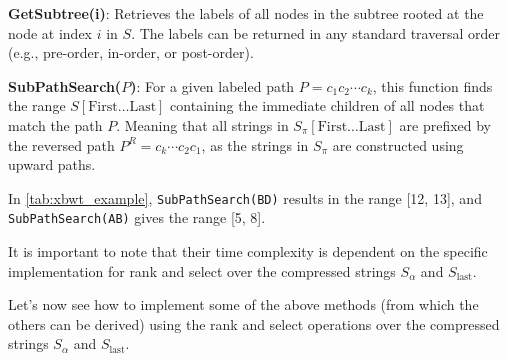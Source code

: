 \textbf{GetSubtree(i)}: Retrieves the labels of all nodes in the subtree rooted at the node at index $i$ in $S$. The labels can be returned in any standard traversal order (e.g., pre-order, in-order, or post-order).

\textbf{SubPathSearch($P$)}: For a given labeled path $P = c_1c_2 \cdots c_k$, this function finds the range $S[\text{First} \dots \text{Last}]$ containing the immediate children of all nodes that match the path $P$. Meaning that all strings in $S_{\pi}[\text{First} \dots \text{Last}]$ are prefixed by the reversed path $P^R = c_k \cdots c_2c_1$, as the strings in $S_{\pi}$ are constructed using upward paths.
\begin{example}
    In \cref{tab:xbwt_example}, \texttt{SubPathSearch(BD)} results in the range [12, 13], and \\ \texttt{SubPathSearch(AB)} gives the range [5, 8].
\end{example}

It is important to note that their time complexity is dependent on the specific implementation for rank and select over the compressed strings $S_{\alpha}$ and $S_{\text{last}}$. 

Let's now see how to implement some of the above methods (from which the others can be derived) using the rank and select operations over the compressed strings $S_{\alpha}$ and $S_{\text{last}}$.

